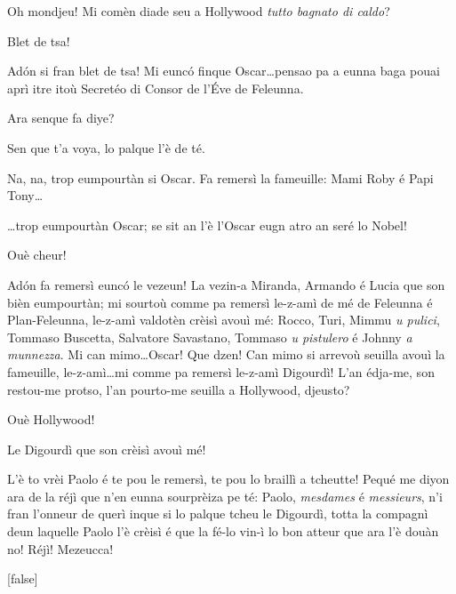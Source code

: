 \begin{drama}
\Cimaspeaks Oh mondjeu! Mi comèn diade seu a Hollywood \og \textit{tutto bagnato di caldo}\fg{}?

\Conducteurspeaks Blet de tsa!

\Cimaspeaks Ad\'on si fran blet de tsa!  Mi eunc\'o finque Oscar\ldots pensao pa a eunna baga pouai aprì itre itoù Secretéo di Consor de l'\'Eve de Feleunna.


\Cimaspeaks Ara senque fa diye?

\Conducteurspeaks Sen que t'a voya, lo palque l'è de té.

\Cimaspeaks{} Na, na, trop eumpourtàn si Oscar. Fa remersì la fameuille: Mami Roby é Papi Tony\ldots 


\Cimaspeaks \ldots trop eumpourtàn Oscar; se sit an l'è l'Oscar eugn atro an seré lo Nobel!

\Conducteurspeaks Ouè cheur!

 \Cimaspeaks{} Ad\'on fa remersì euncó le vezeun! La vezin-a Miranda, Armando é Lucia que son bièn eumpourtàn; mi sourtoù comme pa remersì le-z-amì de mé de Feleunna é Plan-Feleunna, le-z-amì valdotèn crèisì avouì mé: Rocco, Turi, Mimmu \textit{u pulici}, Tommaso Buscetta, Salvatore Savastano, Tommaso \textit{u pistulero} é Johnny \textit{a munnezza}. Mi can mimo\ldots Oscar! Que dzen! Can mimo si arrevoù seuilla avouì la fameuille, le-z-amì\ldots mi comme pa remersì le-z-amì Digourdì! L'an édja-me, son restou-me protso, l'an pourto-me seuilla a Hollywood, djeusto?

\Conducteurspeaks Ouè Hollywood!

\Cimaspeaks Le Digourdì que son crèisì avouì mé!

\Conducteurspeaks L'è to vrèi Paolo é te pou le remersì, te pou lo braillì a tcheutte! Pequé me diyon ara de la réjì que n'en eunna sourprèiza pe té: Paolo, \textit{mesdames} é \textit{messieurs}, n'i fran l'onneur de querì inque si lo palque tcheu le Digourdì, totta la compagnì deun laquelle Paolo l'è crèisì é que la fé-lo vin-ì lo bon atteur que ara l'è douàn no! Réjì! Mezeucca!

[false]



\end{drama}
